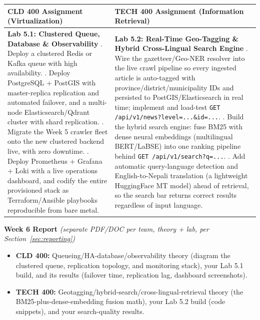 \documentclass[10pt, a4paper]{article}
\newcommand{\weeklyreport}[3]{%
  \par\vspace{0.4em}
  \noindent\colorbox{lightgray!35}{\parbox{\dimexpr\textwidth-2\fboxsep\relax}{%
    \textbf{\color{primary}#1 Report} \textit{(separate PDF/DOC per team, theory + lab, per Section~\ref{sec:reporting})}
    \begin{itemize}
        \item \textbf{CLD 400:} #2
        \item \textbf{TECH 400:} #3
    \end{itemize}
  }}%
  \par\vspace{0.3em}
}
\begin{document}
\begin{table}[H]
\centering
\small
\renewcommand{\arraystretch}{1.2}
\begin{tabularx}{\textwidth}{|X|X|}
\hline
\rowcolor{lightgray}
\textbf{CLD 400 Assignment (Virtualization)} & \textbf{TECH 400 Assignment (Information Retrieval)} \\ \hline
\textbf{Lab 5.1: Clustered Queue, Database \& Observability} \newline
1. Deploy a clustered Redis or Kafka queue with high availability. \newline
2. Deploy PostgreSQL + PostGIS with master-replica replication and automated failover, and a multi-node Elasticsearch/Qdrant cluster with shard replication. \newline
3. Migrate the Week 5 crawler fleet onto the new clustered backend live, with zero downtime. \newline
4. Deploy Prometheus + Grafana + Loki with a live operations dashboard, and codify the entire provisioned stack as Terraform/Ansible playbooks reproducible from bare metal. & \textbf{Lab 5.2: Real-Time Geo-Tagging \& Hybrid Cross-Lingual Search Engine} \newline
1. Wire the gazetteer/Geo-NER resolver into the live crawl pipeline so every ingested article is auto-tagged with province/district/municipality IDs and persisted to PostGIS/Elasticsearch in real time; implement and load-test \texttt{GET /api/v1/news?level=...\&id=...}. \newline
2. Build the hybrid search engine: fuse BM25 with dense neural embeddings (multilingual BERT/LaBSE) into one ranking pipeline behind \texttt{GET /api/v1/search?q=...}. \newline
3. Add automatic query-language detection and English-to-Nepali translation (a lightweight HuggingFace MT model) ahead of retrieval, so the search bar returns correct results regardless of input language. \\ \hline
\end{tabularx}
\end{table}

\weeklyreport{Week 6}{Queueing/HA-database/observability theory (diagram the clustered queue, replication topology, and monitoring stack), your Lab 5.1 build, and its results (failover time, replication lag, dashboard screenshots).}{Geotagging/hybrid-search/cross-lingual-retrieval theory (the BM25-plus-dense-embedding fusion math), your Lab 5.2 build (code snippets), and your search-quality results.}
\end{document}
